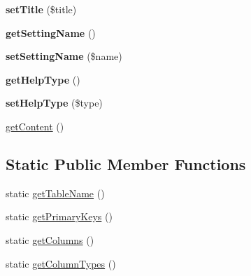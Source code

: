 \begin{DoxyCompactItemize}
\item 
\hypertarget{classHelpParagraph_a464cc8db9610f028fbc9f2f53238ea34}{
{\bfseries setTitle} (\$title)}
\label{classHelpParagraph_a464cc8db9610f028fbc9f2f53238ea34}

\item 
\hypertarget{classHelpParagraph_ad682db4274b720d9a58993260fd8c96c}{
{\bfseries getSettingName} ()}
\label{classHelpParagraph_ad682db4274b720d9a58993260fd8c96c}

\item 
\hypertarget{classHelpParagraph_aa8fbf3e8e291e716cd8382698d9a1448}{
{\bfseries setSettingName} (\$name)}
\label{classHelpParagraph_aa8fbf3e8e291e716cd8382698d9a1448}

\item 
\hypertarget{classHelpParagraph_ae8b6ea8b6bbd790f5a6175519cdee207}{
{\bfseries getHelpType} ()}
\label{classHelpParagraph_ae8b6ea8b6bbd790f5a6175519cdee207}

\item 
\hypertarget{classHelpParagraph_ab939284853c0066a3d1c201031c8792e}{
{\bfseries setHelpType} (\$type)}
\label{classHelpParagraph_ab939284853c0066a3d1c201031c8792e}

\item 
\hyperlink{classHelpParagraph_a20bb8d93c5018911f473df1d8f558f39}{getContent} ()
\end{DoxyCompactItemize}
\subsection*{Static Public Member Functions}
\begin{DoxyCompactItemize}
\item 
static \hyperlink{classHelpParagraph_a646492a40dad4d4a5cad0cd93e4e7cdb}{getTableName} ()
\item 
static \hyperlink{classHelpParagraph_af092a2b620b5efda2dd5f6dc695b9295}{getPrimaryKeys} ()
\item 
static \hyperlink{classHelpParagraph_ae136cb09440d889fe1dc2d552a4995ae}{getColumns} ()
\item 
static \hyperlink{classHelpParagraph_ae270d97d244d3c71ec843e062af29f2c}{getColumnTypes} ()
\end{DoxyCompactItemize}
